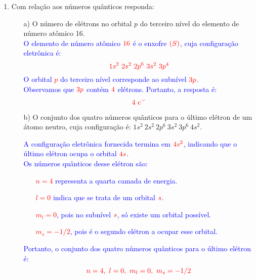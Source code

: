 \documentclass[a4paper, 12pt]{article}
\begin{document}
\begin{enumerate}
	\item Com relação aos números quânticos responda:
	      \begin{enumerate}
		      \item[a)] O número de elétrons no orbital \(p\) do terceiro nível do elemento de número atômico 16.
		            \\[10pt]
		            \textcolor{blue}{
			            O elemento de número atômico \(\textcolor{red}{16}\) é o enxofre \(\textcolor{red}{(S)}\), cuja configuração eletrônica é:
			            \[
				            \textcolor{red}{1s^2 \ 2s^2 \ 2p^6 \ 3s^2  \ 3p^4}
			            \]
			            \textcolor{blue}{O orbital \textcolor{red}{\(p\)} do terceiro nível corresponde ao subnível \(\textcolor{red}{3p}\).} \\[2mm]
			            \textcolor{blue}{Observamos que \(\textcolor{red}{3p}\) contém \(\textcolor{red}{4}\) elétrons. Portanto, a resposta é:}
			            \[
				            \textcolor{red}{4 \text{ $e^{-}$}}
			            \]
		            }
		      \item[b)] O conjunto dos quatro números quânticos para o último elétron de um átomo neutro, cuja configuração é: \(1s^2 \ 2s^2 \ 2p^6 \ 3s^2 \ 3p^6 \ 4s^2\).
		            \\[10pt]
		            \textcolor{blue}{
			            A configuração eletrônica fornecida termina em \(\textcolor{red}{4s^2}\), indicando que o último elétron ocupa o orbital \(\textcolor{red}{4s}\). \\[2mm]
			            \textcolor{blue}{Os números quânticos desse elétron são:}
			            \begin{itemize}
				            \item[] \textcolor{red}{\(n = 4\)} representa a quarta camada de energia.
				            \item[] \textcolor{red}{\(l = 0\)} indica que se trata de um orbital \(\textcolor{red}{s}\).
				            \item[] \textcolor{red}{\(m_l = 0\)}, pois no subnível \(\textcolor{red}{s}\), só existe um orbital possível.
				            \item[] \textcolor{red}{\(m_s = -1/2\)}, pois é o segundo elétron a ocupar esse orbital.
			            \end{itemize}
			            \textcolor{blue}{Portanto, o conjunto dos quatro números quânticos para o último elétron é:}
			            \[
				            \textcolor{red}{n = 4, \ l = 0, \ m_l = 0, \ m_s = -1/2}
			            \]
		            }

\end{enumerate}
\end{enumerate}
\end{document}
